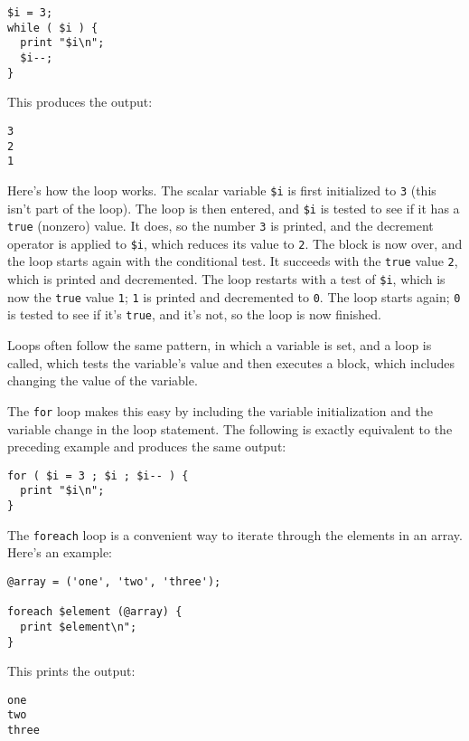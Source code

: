 \begin{lstlisting}
$i = 3;
while ( $i ) {
  print "$i\n";
  $i--;
}
\end{lstlisting}

This produces the output:

\begin{lstlisting}
3
2
1
\end{lstlisting}

Here's how the loop works. The scalar variable \verb|$i| is first initialized to \verb|3| (this isn't part of the loop). The loop is then entered, and \verb|$i| is tested to see if it has a \verb|true| (nonzero) value. It does, so the number \verb|3| is printed, and the decrement operator is applied to \verb|$i|, which reduces its value to \verb|2|. The block is now over, and the loop starts again with the conditional test. It succeeds with the \verb|true| value \verb|2|, which is printed and decremented. The loop restarts with a test of \verb|$i|, which is now the \verb|true| value \verb|1|; \verb|1| is printed and decremented to \verb|0|. The loop starts again; \verb|0| is tested to see if it's \verb|true|, and it's not, so the loop is now finished.

Loops often follow the same pattern, in which a variable is set, and a loop is called, which tests the variable's value and then executes a block, which includes changing the value of the variable.

The \verb|for| loop makes this easy by including the variable initialization and the variable change in the loop statement. The following is exactly equivalent to the preceding example and produces the same output:

\begin{lstlisting}
for ( $i = 3 ; $i ; $i-- ) {
  print "$i\n";
}
\end{lstlisting}

The \verb|foreach| loop is a convenient way to iterate through the elements in an array. Here's an example:

\begin{lstlisting}
@array = ('one', 'two', 'three');

foreach $element (@array) {
  print $element\n";
}
\end{lstlisting}

This prints the output:

\begin{lstlisting}
one
two
three
\end{lstlisting}

